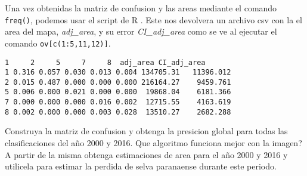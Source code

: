 \begin{exa}
  Una vez obtenidas la matriz de confusion y las areas mediante el comando
  \texttt{freq()}, podemos usar el script de R . Este nos devolvera
  un archivo csv con la el area del mapa, \emph{adj\_area}, y su error \emph{CI\_adj\_area}
  como se ve al ejecutar el comando \texttt{ov[c(1:5,11,12)]}.
  \begin{Verbatim}[fontsize=\small]
      1     2     5     7     8  adj_area CI_adj_area
1 0.316 0.057 0.030 0.013 0.004 134705.31   11396.012
2 0.015 0.487 0.000 0.000 0.000 216164.27    9459.761
5 0.006 0.000 0.021 0.000 0.000  19868.04    6181.366
7 0.000 0.000 0.000 0.016 0.002  12715.55    4163.619
8 0.002 0.000 0.000 0.003 0.028  13510.27    2682.288
  \end{Verbatim}
\end{exa}


\begin{act}
    Construya la matriz de confusion y obtenga la presicion global para todas
    las clasificaciones del a\~no 2000 y 2016. Que algoritmo funciona mejor con la imagen? A partir
    de la misma obtenga estimaciones de area para el a\~no 2000 y 2016 y utilicela
    para estimar la perdida de selva paranaense durante este periodo.
\end{act}
